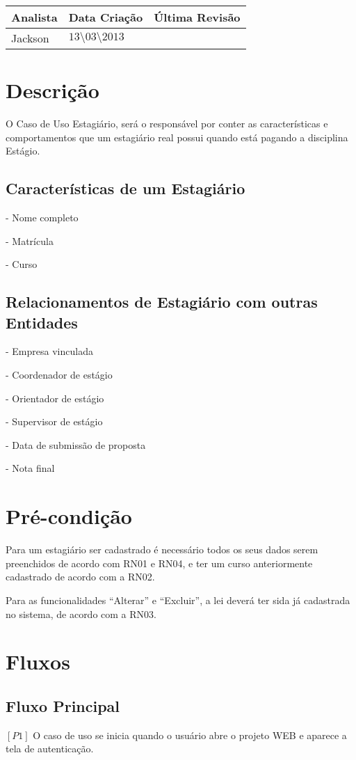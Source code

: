 
\begin{tabular}{|p{4cm}|p{4cm}|p{4cm}|}
\hline
\textbf{Analista} &\textbf{Data Criação} &\textbf{Última Revisão}\\
\hline 
Jackson &$13\setminus03\setminus2013$ &\\
\hline
\end{tabular}

\section{Descrição}
O Caso de Uso Estagiário, será o responsável por conter as características e comportamentos
que um estagiário real possui quando está pagando a disciplina Estágio.

\subsection{Características de um Estagiário}
- Nome completo

- Matrícula

- Curso

\subsection{Relacionamentos de Estagiário com outras Entidades} 

- Empresa vinculada

- Coordenador de estágio

- Orientador de estágio

- Supervisor de estágio

- Data de submissão de proposta

- Nota final

\section{Pré-condição}
Para um estagiário ser cadastrado é necessário todos os seus dados serem preenchidos de
acordo com RN01 e RN04, e ter um curso anteriormente cadastrado de acordo com a RN02.

Para as funcionalidades “Alterar” e “Excluir”, a lei deverá ter sida já cadastrada no sistema,
de acordo com a RN03.

\section{Fluxos}

\subsection{Fluxo Principal}
\textbf{$[P1]$} O caso de uso se inicia quando o usuário abre o projeto WEB e aparece a tela de autenticação.

